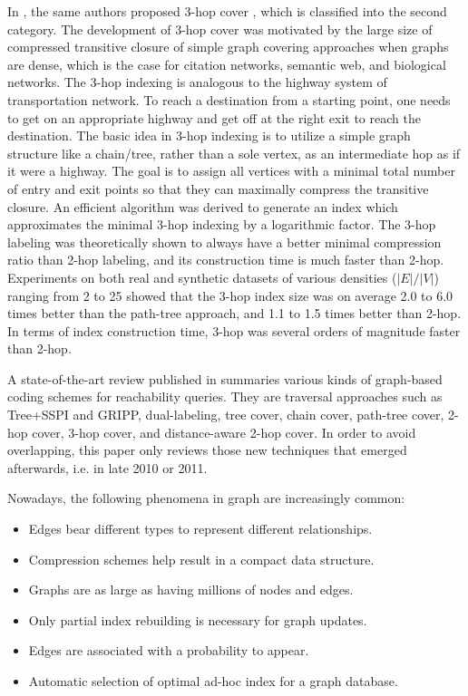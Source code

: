 \documentclass[12pt,conference,compsocconf]{../IEEEtran}
\begin{document}
In \citeyear{1067}, the same authors proposed 3-hop cover \citep{1067}, which is classified into the second category. The development of 3-hop cover was motivated by the large size of compressed transitive closure of simple graph covering approaches when graphs are dense, which is the case for citation networks, semantic web, and biological networks. The 3-hop indexing is analogous to the highway system of transportation network. To reach a destination from a starting point, one needs to get on an appropriate highway and get off at the right exit to reach the destination. The basic idea in 3-hop indexing is to utilize a simple graph structure like a chain/tree, rather than a sole vertex, as an intermediate hop as if it were a highway. The goal is to assign all vertices with a minimal total number of entry and exit points so that they can maximally compress the transitive closure. An efficient algorithm was derived to generate an index which approximates the minimal 3-hop indexing by a logarithmic factor. The 3-hop labeling was theoretically shown to always have a better minimal compression ratio than 2-hop labeling, and its construction time is much faster than 2-hop. Experiments on both real and synthetic datasets of various densities ($|E|/|V|$) ranging from 2 to 25 showed that the 3-hop index size was on average 2.0 to 6.0 times better than the path-tree approach, and 1.1 to 1.5 times better than 2-hop. In terms of index construction time, 3-hop was several orders of magnitude faster than 2-hop.

A state-of-the-art review published in \citeyear{1063} \citep{1063} summaries various kinds of graph-based coding schemes for reachability queries. They are traversal approaches such as Tree+SSPI and GRIPP, dual-labeling, tree cover, chain cover, path-tree cover, 2-hop cover, 3-hop cover, and distance-aware 2-hop cover. In order to avoid overlapping, this paper only reviews those new techniques that emerged afterwards, i.e. in late 2010 or 2011.

Nowadays, the following phenomena in graph are increasingly common:

\begin{itemize}
\item Edges bear different types to represent different relationships.
\item Compression schemes help result in a compact data structure.
\item Graphs are as large as having millions of nodes and edges.
\item Only partial index rebuilding is necessary for graph updates.
\item Edges are associated with a probability to appear.
\item Automatic selection of optimal ad-hoc index for a graph database.
\end{itemize}
\end{document}
